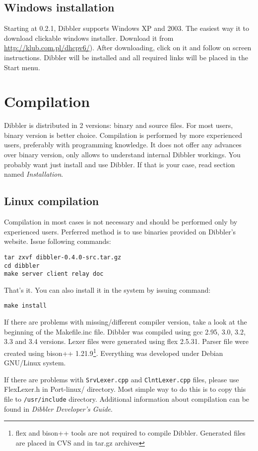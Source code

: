 \subsection{Windows installation}
Starting at 0.2.1, Dibbler supports Windows XP and 2003. The easiest
way it to download clickable windows installer.
Download it from \url{http://klub.com.pl/dhcpv6/}).
After downloading, click on it and follow on screen
instructions. Dibbler will be installed and all required links will be
placed in the Start menu.

\section{Compilation}
Dibbler is distributed in 2 versions: binary and source files. For
most users, binary version is better choice.  Compilation is
performed by more experienced users, preferably with programming
knowledge. It does not offer any advances over binary version, only
allows to understand internal Dibbler workings. You probably want just
install and use Dibbler. If that is your case, read section
named \emph{Installation}.

\subsection{Linux compilation}

Compilation in most cases is not necessary and should be performed
only by experienced users. Perferred method is to use binaries
provided on Dibbler's website. Issue following commands:
\begin{verbatim}
tar zxvf dibbler-0.4.0-src.tar.gz
cd dibbler
make server client relay doc
\end{verbatim}
That's it. You can also install it in the system by issuing command:

\begin{verbatim}
make install
\end{verbatim}

If there are problems with missing/different compiler
version, take a look at the beginning of the Makefile.inc
file. Dibbler was compiled using gcc 2.95, 3.0, 3.2, 3.3 and 3.4
versions. Lexer files were generated using flex 2.5.31. Parser file
were created using bison++ 1.21.9\footnote{flex and bison++ tools are
  not required to compile Dibbler. Generated files are placed in CVS
  and in tar.gz archives}. Everything was developed under Debian
GNU/Linux system.

If there are problems with \verb+SrvLexer.cpp+ and
\verb+ClntLexer.cpp+ files, please use FlexLexer.h in Port-linux/
directory. Most simple way to do this is to copy this file to
\verb+/usr/include+ directory. Additional information about
compilation can be found in \emph{Dibbler Developer's Guide}.

